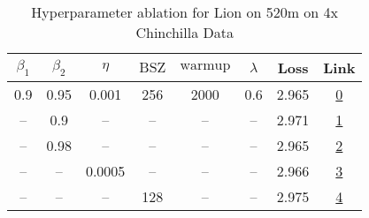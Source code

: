 \begin{table}[H]
\centering
\caption{Hyperparameter ablation for Lion on 520m on 4x Chinchilla Data}
\label{tab:ablation_lion_520m_4}
\begin{tabular}{cccccccc}
\toprule
$\beta_1$ & $\beta_2$ & $\eta$ & $\mathrm{BSZ}$ & $\mathrm{warmup}$ & $\lambda$ & Loss & Link \\
\midrule
0.9 & 0.95 & 0.001 & 256 & 2000 & 0.6 & 2.965 & \href{https://wandb.ai/stanford-mercury/optimizer-scaling/runs/sweep-520m-42B-lion30535dlr0.001-wd0.6-minlr0-warmup2000-b10.9-b-b687e1}{0} \\
\midrule
-- & 0.9 & -- & -- & -- & -- & 2.971 & \href{https://wandb.ai/stanford-mercury/optimizer-scaling/runs/sweep-520m-42B-lion6d497blr0.001-wd0.6-minlr0-warmup2000-b10.9-b-d19dd3}{1} \\
-- & 0.98 & -- & -- & -- & -- & 2.965 & \href{https://wandb.ai/stanford-mercury/optimizer-scaling/runs/sweep-520m-42B-lion70e78flr0.001-wd0.6-minlr0-warmup2000-b10.9-b-fa40d0}{2} \\
-- & -- & 0.0005 & -- & -- & -- & 2.966 & \href{https://wandb.ai/stanford-mercury/optimizer-scaling/runs/sweep-520m-42B-lion9e353dlr0.0005-wd0.6-minlr0-warmup2000-b10.9--e8f576}{3} \\
-- & -- & -- & 128 & -- & -- & 2.975 & \href{https://wandb.ai/stanford-mercury/optimizer-scaling/runs/sweep-520m-42B-lion2b623elr0.001-wd0.6-minlr0-warmup2000-b10.9-b-f4b0ad}{4} \\
\bottomrule
\end{tabular}
\end{table}

